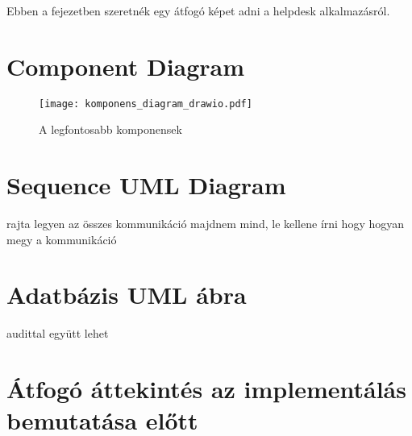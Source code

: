 Ebben a fejezetben szeretnék egy átfogó képet adni a helpdesk alkalmazásról.

\section{Component Diagram}


\begin{figure}[hbt] 
	\centering
	\texttt{[image: komponens\_diagram\_drawio.pdf]}
	\caption{A legfontosabb komponensek}
	\label{fig:komponens_diagram}
\end{figure}

\section{Sequence UML Diagram}
rajta legyen az összes kommunikáció majdnem mind, 
le kellene írni hogy hogyan megy a kommunikáció

\section{Adatbázis UML ábra}
audittal együtt lehet 

\section{Átfogó áttekintés az implementálás bemutatása előtt}
